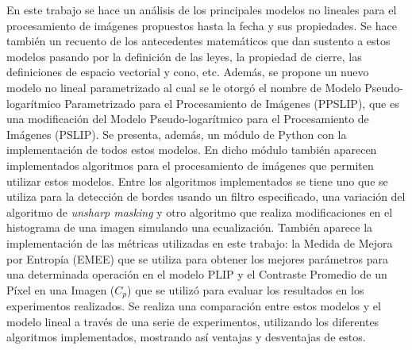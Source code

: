 \begin{resumen}
	En este trabajo se hace un an\'alisis de los principales modelos no lineales para el procesamiento de im\'agenes propuestos hasta la fecha y sus propiedades. Se hace tambi\'en un recuento de los antecedentes matem\'aticos que dan sustento a estos modelos pasando por la definici\'on de las leyes, la propiedad de cierre, las definiciones de espacio vectorial y cono, etc. Adem\'as, se propone un nuevo modelo no lineal parametrizado al cual se le otorg\'o el nombre de Modelo Pseudo-logar\'itmico Parametrizado para el Procesamiento de Im\'agenes (PPSLIP), que es una modificaci\'on del Modelo Pseudo-logar\'itmico para el Procesamiento de Im\'agenes (PSLIP). Se presenta, adem\'as, un m\'odulo de Python con la implementaci\'on de todos estos modelos. En dicho m\'odulo tambi\'en aparecen implementados algoritmos para el procesamiento de im\'agenes que permiten utilizar estos modelos. Entre los algoritmos implementados se tiene uno que se utiliza para la detecci\'on de bordes usando un filtro especificado, una variaci\'on del algoritmo de \textit{unsharp masking} y otro algoritmo que realiza modificaciones en el histograma de una imagen simulando una ecualizaci\'on. Tambi\'en aparece la implementaci\'on de las m\'etricas utilizadas en este trabajo: la Medida de Mejora por Entropía (EMEE) que se utiliza para obtener los mejores par\'ametros para una determinada operaci\'on en el modelo PLIP y el Contraste Promedio de un P\'ixel en una Imagen ($C_p$) que se utiliz\'o para evaluar los resultados en los experimentos realizados. Se realiza una comparaci\'on entre estos modelos y el modelo lineal a trav\'es de una serie de experimentos, utilizando los diferentes algoritmos implementados, mostrando as\'i ventajas y desventajas de estos.
\end{resumen}

